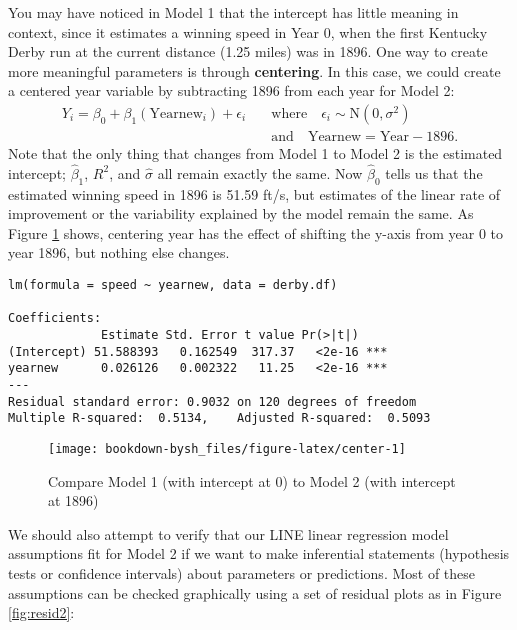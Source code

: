 \documentclass[
]{krantz}
\begin{document}
You may have noticed in Model 1 that the intercept has little meaning in context, since it estimates a winning speed in Year 0, when the first Kentucky Derby run at the current distance (1.25 miles) was in 1896. One way to create more meaningful parameters is through \textbf{centering}. In this case, we could create a centered year variable by subtracting 1896 from each year for Model 2:
\begin{equation}
\begin{split}
Y_{i}=\beta_{0}+\beta_{1}(\textrm{Yearnew}_{i})+\epsilon_{i}\quad &\textrm{where} \quad \epsilon_{i}\sim \textrm{N}(0,\sigma^2) \\
    &\textrm{and} \quad \textrm{Yearnew}=\textrm{Year}-1896.
\end{split}
\label{eq:model2}
\end{equation}
Note that the only thing that changes from Model 1 to Model 2 is the estimated intercept; \(\hat{\beta}_{1}\), \(R^2\), and \(\hat{\sigma}\) all remain exactly the same. Now \(\hat{\beta}_{0}\) tells us that the estimated winning speed in 1896 is 51.59 ft/s, but estimates of the linear rate of improvement or the variability explained by the model remain the same. As Figure \ref{fig:center} shows, centering year has the effect of shifting the y-axis from year 0 to year 1896, but nothing else changes.

\begin{verbatim}
lm(formula = speed ~ yearnew, data = derby.df)

Coefficients:
             Estimate Std. Error t value Pr(>|t|)    
(Intercept) 51.588393   0.162549  317.37   <2e-16 ***
yearnew      0.026126   0.002322   11.25   <2e-16 ***
---
Residual standard error: 0.9032 on 120 degrees of freedom
Multiple R-squared:  0.5134,    Adjusted R-squared:  0.5093 
\end{verbatim}

\begin{figure}

{\centering \texttt{[image: bookdown-bysh\_files/figure-latex/center-1]} 

}

\caption{Compare Model 1 (with intercept at 0) to Model 2 (with intercept at 1896)}\label{fig:center}
\end{figure}

We should also attempt to verify that our LINE linear regression model assumptions fit for Model 2 if we want to make inferential statements (hypothesis tests or confidence intervals) about parameters or predictions. Most of these assumptions can be checked graphically using a set of residual plots as in Figure \ref{fig:resid2}:
\end{document}
